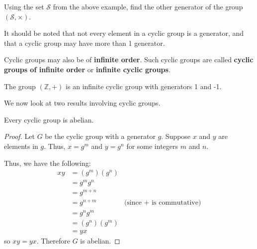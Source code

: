 \begin{exercise}
    Using the set $\mathcal{S}$ from the above example, find the other generator of the group $(\mathcal{S}, \times)$.
\end{exercise}

It should be noted that not every element in a cyclic group is a generator, and that a cyclic group may have more than 1 generator.

Cyclic groups may also be of \textbf{infinite order}. Such cyclic groups are called \textbf{cyclic groups of infinite order} or \textbf{infinite cyclic groups}.
\begin{example}
    The group $(\mathbb{Z}, +)$ is an infinite cyclic group with generators 1 and -1.
\end{example}

We now look at two results involving cyclic groups.

\begin{proposition}\label{prop-cyclic-group-is-abelian}
    Every cyclic group is abelian.
\end{proposition}
\begin{proof}
    Let $G$ be the cyclic group with a generator $g$. Suppose $x$ and $y$ are elements in $g$. Thus, $x = g^m$ and $y = g^n$ for some integers $m$ and $n$.

    Thus, we have the following:
    \begin{align*}
        xy &= (g^m)(g^n)\\
        &= g^mg^n\\
        &= g^{m+n}\\
        &= g^{n+m} & \text{(since + is commutative)}\\
        &= g^ng^m\\
        &= (g^n)(g^m)\\
        &= yx
    \end{align*}
    so $xy = yx$. Therefore $G$ is abelian.
\end{proof}

